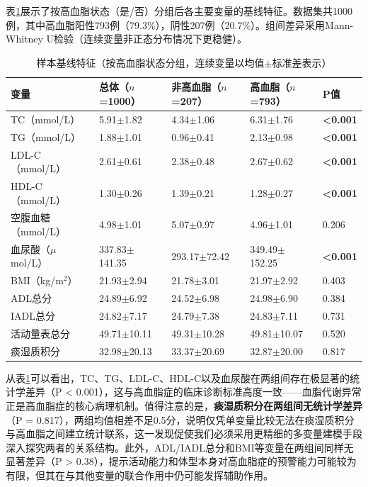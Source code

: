 \documentclass[12pt,a4paper]{ctexart}
\begin{document}
表\ref{tab:baseline}展示了按高血脂状态（是/否）分组后各主要变量的基线特征。数据集共1000例，其中高血脂阳性793例（79.3\%），阴性207例（20.7\%）。组间差异采用Mann-Whitney U检验（连续变量非正态分布情况下更稳健）。
\begin{table}[H]
\centering
\caption{样本基线特征（按高血脂状态分组，连续变量以均值$\pm$标准差表示）}
\label{tab:baseline}
\begin{tabular}{lllll}
\toprule
变量 & 总体（$n$=1000） & 非高血脂（$n$=207） & 高血脂（$n$=793） & P值 \\
\midrule
TC（mmol/L）         & 5.91$\pm$1.82 & 4.34$\pm$1.06 & 6.31$\pm$1.76 & \textbf{<0.001} \\
TG（mmol/L）         & 1.88$\pm$1.01 & 0.96$\pm$0.41 & 2.13$\pm$0.98 & \textbf{<0.001} \\
LDL-C（mmol/L）      & 2.61$\pm$0.61 & 2.38$\pm$0.48 & 2.67$\pm$0.62 & \textbf{<0.001} \\
HDL-C（mmol/L）      & 1.30$\pm$0.26 & 1.39$\pm$0.21 & 1.28$\pm$0.27 & \textbf{<0.001} \\
空腹血糖（mmol/L）   & 4.98$\pm$1.01 & 5.07$\pm$0.97 & 4.96$\pm$1.01 & 0.206 \\
血尿酸（$\mu$mol/L） & 337.83$\pm$141.35 & 293.17$\pm$72.42 & 349.49$\pm$152.25 & \textbf{<0.001} \\
BMI（kg/m$^2$）      & 21.93$\pm$2.94 & 21.78$\pm$3.01 & 21.97$\pm$2.92 & 0.403 \\
ADL总分              & 24.89$\pm$6.92 & 24.52$\pm$6.98 & 24.98$\pm$6.90 & 0.384 \\
IADL总分             & 24.82$\pm$7.17 & 24.79$\pm$7.38 & 24.83$\pm$7.11 & 0.731 \\
活动量表总分         & 49.71$\pm$10.11 & 49.31$\pm$10.28 & 49.81$\pm$10.07 & 0.520 \\
痰湿质积分           & 32.98$\pm$20.13 & 33.37$\pm$20.69 & 32.87$\pm$20.00 & 0.817 \\
\bottomrule
\end{tabular}
\end{table}
从表\ref{tab:baseline}可以看出，TC、TG、LDL-C、HDL-C以及血尿酸在两组间存在极显著的统计学差异（P < 0.001），这与高血脂症的临床诊断标准高度一致——血脂代谢异常正是高血脂症的核心病理机制。值得注意的是，\textbf{痰湿质积分在两组间无统计学差异}（P = 0.817），两组均值相差不足0.5分，说明仅凭单变量比较无法在痰湿质积分与高血脂之间建立统计联系，这一发现促使我们必须采用更精细的多变量建模手段深入探究两者的关系结构。此外，ADL/IADL总分和BMI等变量在两组间同样无显著差异（P > 0.38），提示活动能力和体型本身对高血脂症的预警能力可能较为有限，但其在与其他变量的联合作用中仍可能发挥辅助作用。
\end{document}
